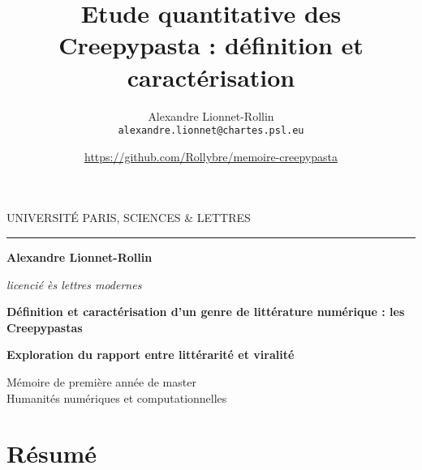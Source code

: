 \documentclass[12pt,a4paper,oneside,titlepage]{book} %
\author{Alexandre Lionnet-Rollin\\
	\texttt{alexandre.lionnet@chartes.psl.eu} \and \url{https://github.com/Rollybre/memoire-creepypasta}}
\title{Etude quantitative des Creepypasta : définition et caractérisation}
\begin{document}
\begin{titlepage}
	\begin{center}
		
		\bigskip
		
		\begin{large}
			UNIVERSITÉ PARIS, SCIENCES \& LETTRES
		\end{large}
		\begin{center}\rule{2cm}{0.02cm}\end{center}
		
		\bigskip
		\bigskip
		\bigskip
		\begin{Large}
			\textbf{Alexandre Lionnet-Rollin}\\
		\end{Large}
		\begin{normalsize} \textit{licencié ès lettres modernes}\\
			
		\end{normalsize}
		
		\bigskip
		\bigskip
		\bigskip
		
		\begin{Huge}
			\textbf{Définition et caractérisation d'un genre de littérature numérique : les Creepypastas}\\
		\end{Huge}
		\bigskip
		\bigskip
		\begin{LARGE}
		\textbf{Exploration du rapport entre littérarité et viralité}\\
		\end{LARGE}
		
		\bigskip
		\bigskip
		\bigskip
		\begin{large}
		\end{large}
		\vfill
		
		\begin{large}
			Mémoire de première année de master\\
			\og Humanités numériques et computationnelles \fg{} \\
		\end{large}
		
	\end{center}
\end{titlepage}

\thispagestyle{empty}

\cleardoublepage

\section*{Résumé}
\end{document}
